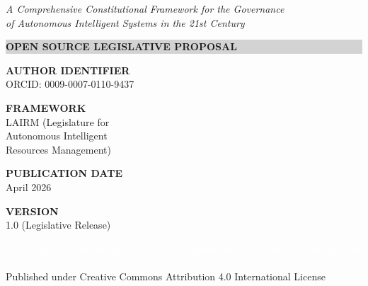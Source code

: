 \begin{titlepage}
\vspace{0.3cm}

{\large\itshape
A Comprehensive Constitutional Framework for the Governance\\
of Autonomous Intelligent Systems in the 21st Century\par}

\vspace{1.5cm}

\noindent\colorbox{lightgray}{%
    \parbox{0.85\textwidth}{%
        \vspace{12pt}
        \centering
        {\Large\sffamily\bfseries OPEN SOURCE LEGISLATIVE PROPOSAL}
        \vspace{12pt}
    }%
}

\vfill

\begin{minipage}[t]{0.45\textwidth}
    \raggedright
    \sffamily\small
    \textbf{\textcolor{legislativeblue}{AUTHOR IDENTIFIER}}\\[4pt]
    ORCID: 0009-0007-0110-9437
    
    \vspace{0.8cm}
    
    \textbf{\textcolor{legislativeblue}{FRAMEWORK}}\\[4pt]
    LAIRM (Legislature for\\
    Autonomous Intelligent\\
    Resources Management)
\end{minipage}%
\hfill
\begin{minipage}[t]{0.45\textwidth}
    \raggedleft
    \sffamily\small
    \textbf{\textcolor{legislativeblue}{PUBLICATION DATE}}\\[4pt]
    April 2026
    
    \vspace{0.8cm}
    
    \textbf{\textcolor{legislativeblue}{VERSION}}\\[4pt]
    1.0 (Legislative Release)
\end{minipage}

\vspace{1.2cm}

\noindent\colorbox{legislativeblue}{%
    \parbox{\dimexpr\textwidth-2\fboxsep\relax}{%
        \vspace{8pt}
        \centering
        \textcolor{white}{\small\sffamily\textit{Submitted for adoption by international organizations, national governments, and regulatory bodies}}\\[2pt]
        \textcolor{accentgold}{\tiny\sffamily Published under Creative Commons Attribution 4.0 International License}
        \vspace{8pt}
    }%
}

\end{titlepage}

